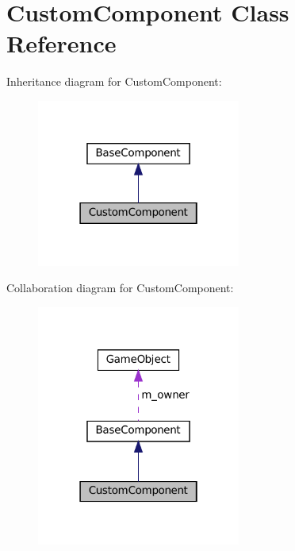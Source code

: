 \hypertarget{classCustomComponent}{}\section{Custom\+Component Class Reference}
\label{classCustomComponent}


Inheritance diagram for Custom\+Component\+:\nopagebreak
\begin{figure}[H]
\begin{center}
\leavevmode
\includegraphics[width=190pt]{classCustomComponent__inherit__graph}
\end{center}
\end{figure}


Collaboration diagram for Custom\+Component\+:\nopagebreak
\begin{figure}[H]
\begin{center}
\leavevmode
\includegraphics[width=190pt]{classCustomComponent__coll__graph}
\end{center}
\end{figure}
